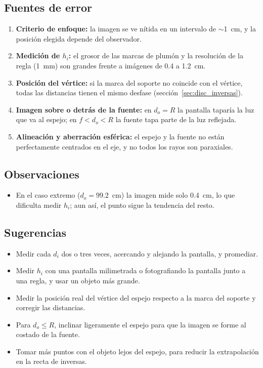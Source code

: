 \documentclass[11pt,a4paper]{article}
\begin{document}
\subsection{Fuentes de error}
\begin{enumerate}
  \item \textbf{Criterio de enfoque:} la imagen se ve nítida en un intervalo de $\sim$1~cm, y la posición elegida depende del observador.
  \item \textbf{Medición de $h_i$:} el grosor de las marcas de plumón y la resolución de la regla (1~mm) son grandes frente a imágenes de 0.4 a 1.2~cm.
  \item \textbf{Posición del vértice:} si la marca del soporte no coincide con el vértice, todas las distancias tienen el mismo desfase (sección~\ref{sec:disc_inversas}).
  \item \textbf{Imagen sobre o detrás de la fuente:} en $d_o = R$ la pantalla taparía la luz que va al espejo; en $f < d_o < R$ la fuente tapa parte de la luz reflejada.
  \item \textbf{Alineación y aberración esférica:} el espejo y la fuente no están perfectamente centrados en el eje, y no todos los rayos son paraxiales.
\end{enumerate}

\subsection{Observaciones}
\begin{itemize}
  \item En el caso extremo ($d_o = 99.2$~cm) la imagen mide solo 0.4~cm, lo que dificulta medir $h_i$; aun así, el punto sigue la tendencia del resto.
\end{itemize}

\subsection{Sugerencias}
\begin{itemize}
  \item Medir cada $d_i$ dos o tres veces, acercando y alejando la pantalla, y promediar.
  \item Medir $h_i$ con una pantalla milimetrada o fotografiando la pantalla junto a una regla, y usar un objeto más grande.
  \item Medir la posición real del vértice del espejo respecto a la marca del soporte y corregir las distancias.
  \item Para $d_o \le R$, inclinar ligeramente el espejo para que la imagen se forme al costado de la fuente.
  \item Tomar más puntos con el objeto lejos del espejo, para reducir la extrapolación en la recta de inversas.
\end{itemize}
\end{document}
